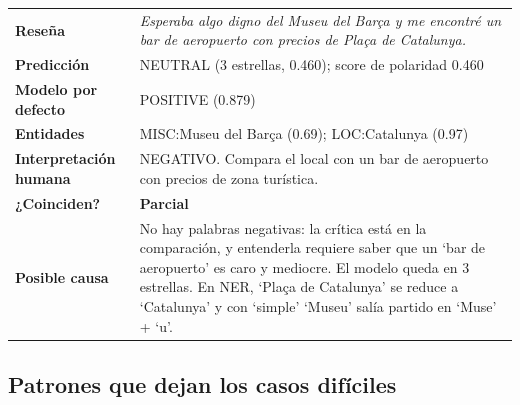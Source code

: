 \documentclass[12pt,a4paper]{article}
\begin{document}
\par\noindent\begin{minipage}{\linewidth}\centering\small\renewcommand{\arraystretch}{1.3}
\begin{tabular}{|>{\raggedright\arraybackslash}p{3.1cm}|>{\raggedright\arraybackslash}p{11.9cm}|}
\hline
\multicolumn{2}{|l|}{\textbf{\textcolor{azulUVG}{\#28 · Negatividad implícita + NER}}} \\ \hline
\textbf{Reseña} & \emph{Esperaba algo digno del Museu del Barça y me encontré un bar de aeropuerto con precios de Plaça de Catalunya.} \\ \hline
\textbf{Predicción} & NEUTRAL (3 estrellas, 0.460); score de polaridad 0.460 \\ \hline
\textbf{Modelo por defecto} & POSITIVE (0.879) \\ \hline
\textbf{Entidades} & MISC:Museu del Barça (0.69); LOC:Catalunya (0.97) \\ \hline
\textbf{Interpretación humana} & NEGATIVO. Compara el local con un bar de aeropuerto con precios de zona turística. \\ \hline
\textbf{¿Coinciden?} & \textbf{\textcolor{orange!80!black}{Parcial}} \\ \hline
\textbf{Posible causa} & No hay palabras negativas: la crítica está en la comparación, y entenderla requiere saber que un `bar de aeropuerto' es caro y mediocre. El modelo queda en 3 estrellas. En NER, `Plaça de Catalunya' se reduce a `Catalunya' y con `simple' `Museu' salía partido en `Muse' + `u'. \\ \hline
\end{tabular}
\end{minipage}\par\bigskip

\subsection{Patrones que dejan los casos difíciles}
\end{document}
